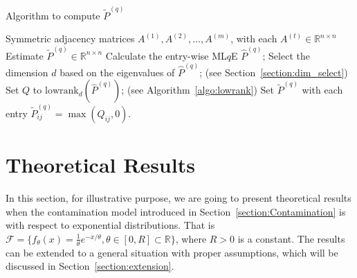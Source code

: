 \documentclass[a4paper]{article}
\renewcommand{\hat}{\widehat}
\begin{document}
\begin{algorithm}[H]
\caption{Algorithm to compute $\widetilde{P}^{(q)}$}
\label{algo:basic_q}
\begin{algorithmic}[1]
\REQUIRE Symmetric adjacency matrices $A^{(1)}, A^{(2)}, \dotsc, A^{(m)}$, with each $A^{(t)} \in \mathbb{R}^{n \times n}$
\ENSURE Estimate $\widetilde{P}^{(q)} \in \mathbb{R}^{n \times n}$
\STATE Calculate the entry-wise ML$q$E $\hat{P}^{(q)}$;
\STATE Select the dimension $d$ based on the eigenvalues of $\hat{P}^{(q)}$; (see Section~\ref{section:dim_select})
\STATE Set $Q$ to $\mathrm{lowrank}_d(\hat{P}^{(q)})$; (see Algorithm~\ref{algo:lowrank})
\STATE Set $\widetilde{P}^{(q)}$ with each entry $\widetilde{P}^{(q)}_{ij} = \max(Q_{ij}, 0)$.
\end{algorithmic}
\end{algorithm}


\section{Theoretical Results}
\label{section:theory}
In this section, for illustrative purpose, we are going to present theoretical results when the contamination model introduced in Section~\ref{section:Contamination} is with respect to exponential distributions. That is $\mathcal{F} = \{ f_{\theta}(x) = \frac{1}{\theta} e^{-x/\theta}, \theta \in [0, R] \subset \mathbb{R} \}$, where $R > 0$ is a constant. The results can be extended to a general situation with proper assumptions, which will be discussed in Section~\ref{section:extension}.
\end{document}
